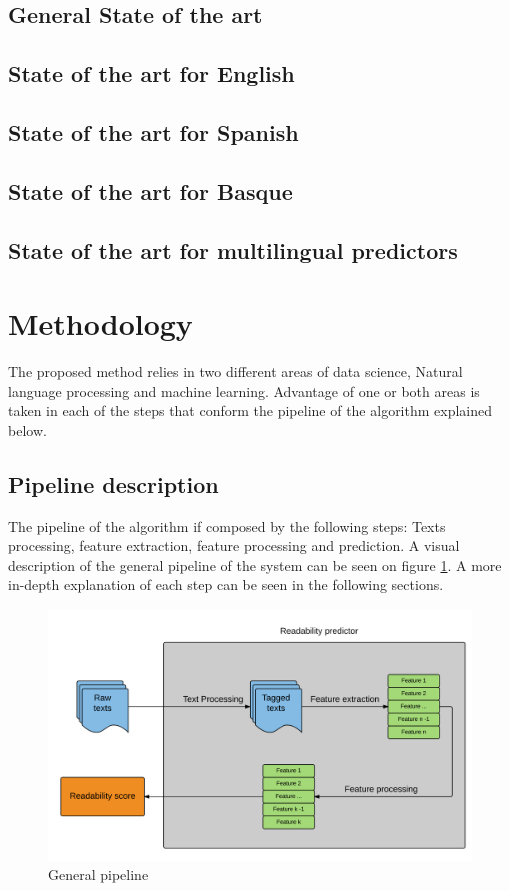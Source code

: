 \documentclass[12pt]{article}
\begin{document}
\subsection{General State of the art}

\subsection{State of the art for English}
\subsection{State of the art for Spanish}
\subsection{State of the art for Basque}

\subsection{State of the art for multilingual predictors}

\section{Methodology}
The proposed method relies in two different areas of data science, Natural language processing and machine learning. Advantage of one or both areas is taken in each of the steps that conform the pipeline of the algorithm explained below.
\subsection{Pipeline description}
The pipeline of the algorithm if composed by the following steps: Texts processing, feature extraction, feature processing and prediction. A visual description of the general pipeline of the system can be seen on figure \ref{fig:pipeline}.  A more in-depth explanation of each step can be seen in the following sections.

\begin{figure}[h]
\includegraphics[width=\textwidth]{pipeline}
\caption{General pipeline}
\label{fig:pipeline}
\end{figure}
\end{document}
